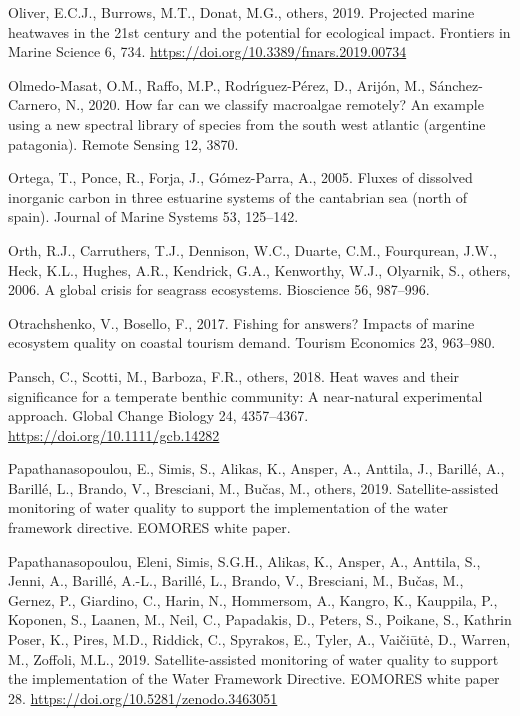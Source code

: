 \documentclass[
  letterpaper,
  11pt,
  english,
  singlespacing,
  headsepline]{MastersDoctoralThesis}
\newlength{\cslhangindent}
\newenvironment{CSLReferences}[2] %
 {\begin{list}{}{%
  \setlength{\itemindent}{0pt}
  \setlength{\leftmargin}{0pt}
  \setlength{\parsep}{0pt}
  \ifodd #1
   \setlength{\leftmargin}{\cslhangindent}
   \setlength{\itemindent}{-1\cslhangindent}
  \fi
  \setlength{\itemsep}{#2\baselineskip}}}
 {\end{list}}
\begin{document}
\begin{CSLReferences}{1}{0}
Oliver, E.C.J., Burrows, M.T., Donat, M.G., others, 2019. Projected
marine heatwaves in the 21st century and the potential for ecological
impact. Frontiers in Marine Science 6, 734.
\url{https://doi.org/10.3389/fmars.2019.00734}

Olmedo-Masat, O.M., Raffo, M.P., Rodrı́guez-Pérez, D., Arijón, M.,
Sánchez-Carnero, N., 2020. How far can we classify macroalgae remotely?
An example using a new spectral library of species from the south west
atlantic (argentine patagonia). Remote Sensing 12, 3870.

Ortega, T., Ponce, R., Forja, J., Gómez-Parra, A., 2005. Fluxes of
dissolved inorganic carbon in three estuarine systems of the cantabrian
sea (north of spain). Journal of Marine Systems 53, 125--142.

Orth, R.J., Carruthers, T.J., Dennison, W.C., Duarte, C.M., Fourqurean,
J.W., Heck, K.L., Hughes, A.R., Kendrick, G.A., Kenworthy, W.J.,
Olyarnik, S., others, 2006. A global crisis for seagrass ecosystems.
Bioscience 56, 987--996.

Otrachshenko, V., Bosello, F., 2017. Fishing for answers? Impacts of
marine ecosystem quality on coastal tourism demand. Tourism Economics
23, 963--980.

Pansch, C., Scotti, M., Barboza, F.R., others, 2018. Heat waves and
their significance for a temperate benthic community: A near-natural
experimental approach. Global Change Biology 24, 4357--4367.
\url{https://doi.org/10.1111/gcb.14282}

Papathanasopoulou, E., Simis, S., Alikas, K., Ansper, A., Anttila, J.,
Barillé, A., Barillé, L., Brando, V., Bresciani, M., Bučas, M., others,
2019. Satellite-assisted monitoring of water quality to support the
implementation of the water framework directive. EOMORES white paper.

Papathanasopoulou, Eleni, Simis, S.G.H., Alikas, K., Ansper, A.,
Anttila, S., Jenni, A., Barillé, A.-L., Barillé, L., Brando, V.,
Bresciani, M., Bučas, M., Gernez, P., Giardino, C., Harin, N.,
Hommersom, A., Kangro, K., Kauppila, P., Koponen, S., Laanen, M., Neil,
C., Papadakis, D., Peters, S., Poikane, S., Kathrin Poser, K., Pires,
M.D., Riddick, C., Spyrakos, E., Tyler, A., Vaičiūtė, D., Warren, M.,
Zoffoli, M.L., 2019. {Satellite-assisted monitoring of water quality to
support the implementation of the Water Framework Directive}. EOMORES
white paper 28. \url{https://doi.org/10.5281/zenodo.3463051}


\end{CSLReferences}
\end{document}
